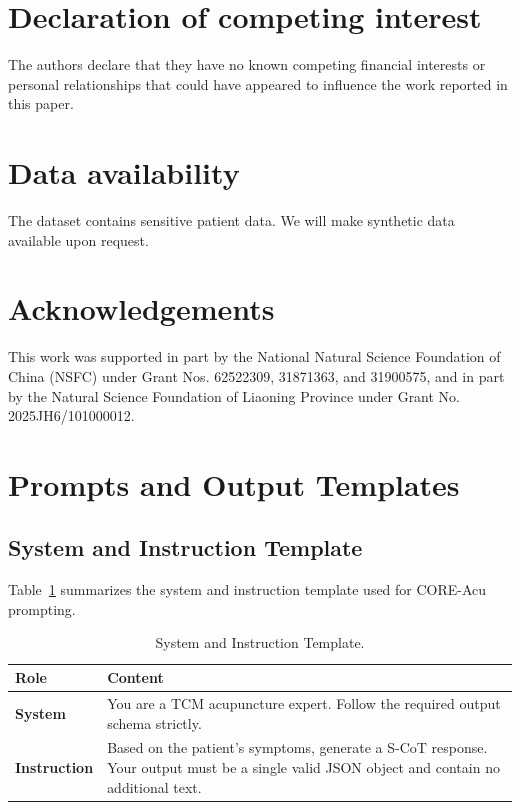 \documentclass[preprint,5p,times,twocolumn,fleqn]{elsarticle}
\begin{document}
\section*{Declaration of competing interest}
The authors declare that they have no known competing financial interests or personal relationships that could have appeared to influence the work reported in this paper.

\section*{Data availability}
The dataset contains sensitive patient data. We will make synthetic data available upon request.


\section*{Acknowledgements}
This work was supported in part by the National Natural Science Foundation of China (NSFC) under Grant Nos. 62522309, 31871363, and 31900575, and in part by the Natural Science Foundation of Liaoning Province under Grant No. 2025JH6/101000012.


\clearpage
\FloatBarrier
\onecolumn

\appendix

\renewcommand{\thetable}{\thesection.\arabic{table}}

\section{Prompts and Output Templates}
\label{app:prompts}

\subsection{System and Instruction Template}
Table~\ref{tab:prompt_template} summarizes the system and instruction template used for CORE-Acu prompting.

\begin{table}[htbp]
  \centering
  \small
  \renewcommand{\arraystretch}{1.25}
  \setlength{\tabcolsep}{6pt}
  \caption{System and Instruction Template.}
  \label{tab:prompt_template}
  \begin{tabularx}{\textwidth}{@{}l X@{}}
    \toprule
    \textbf{Role} & \textbf{Content} \\
    \midrule
    \textbf{System} & You are a TCM acupuncture expert. Follow the required output schema strictly. \\
    \textbf{Instruction} & Based on the patient's symptoms, generate a S-CoT response. Your output must be a single valid JSON object and contain no additional text. \\
    \bottomrule
  \end{tabularx}
\end{table}
\end{document}
